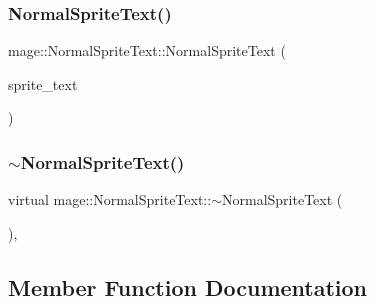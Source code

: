 \hypertarget{classmage_1_1_normal_sprite_text_ae16d982e1d959b6b80f82610b07ec15b}{}\label{classmage_1_1_normal_sprite_text_ae16d982e1d959b6b80f82610b07ec15b} 
\subsubsection{\texorpdfstring{Normal\+Sprite\+Text()}{NormalSpriteText()}\hspace{0.1cm}{\footnotesize\ttfamily [3/3]}}
{\footnotesize\ttfamily mage\+::\+Normal\+Sprite\+Text\+::\+Normal\+Sprite\+Text (\begin{DoxyParamCaption}\item[{\hyperlink{classmage_1_1_normal_sprite_text}{Normal\+Sprite\+Text} \&\&}]{sprite\+\_\+text }\end{DoxyParamCaption})\hspace{0.3cm}{\ttfamily [default]}}

\hypertarget{classmage_1_1_normal_sprite_text_a5ead5607cb41849419827ff231b4ea9d}{}\label{classmage_1_1_normal_sprite_text_a5ead5607cb41849419827ff231b4ea9d} 
\subsubsection{\texorpdfstring{$\sim$\+Normal\+Sprite\+Text()}{~NormalSpriteText()}}
{\footnotesize\ttfamily virtual mage\+::\+Normal\+Sprite\+Text\+::$\sim$\+Normal\+Sprite\+Text (\begin{DoxyParamCaption}{ }\end{DoxyParamCaption})\hspace{0.3cm}{\ttfamily [virtual]}, {\ttfamily [default]}}



\subsection{Member Function Documentation}
\hypertarget{classmage_1_1_normal_sprite_text_aef48e90667849cd9ec01510baf1394cb}{}\label{classmage_1_1_normal_sprite_text_aef48e90667849cd9ec01510baf1394cb} 
